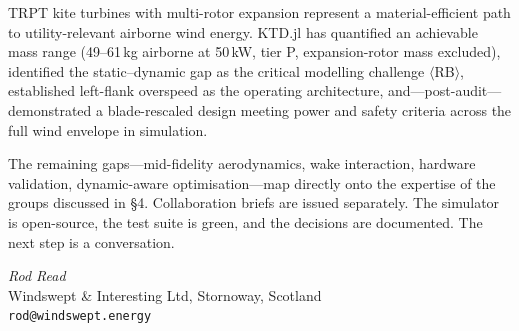 \documentclass[11pt,a4paper]{article}
\newcommand{\RB}{$\langle$RB$\rangle$}  %
\begin{document}
TRPT kite turbines with multi-rotor expansion represent a material-efficient path to
utility-relevant airborne wind energy.
KTD.jl has quantified an achievable mass range (49--61\,kg airborne at 50\,kW, tier P,
expansion-rotor mass excluded), identified the static--dynamic gap as the critical modelling
challenge \RB{}, established left-flank overspeed as the operating architecture, and---post-audit---demonstrated
a blade-rescaled design meeting power and safety criteria across the full wind envelope in simulation.

The remaining gaps---mid-fidelity aerodynamics, wake interaction, hardware validation,
dynamic-aware optimisation---map directly onto the expertise of the groups discussed in \S4.
Collaboration briefs are issued separately.
The simulator is open-source, the test suite is green, and the decisions are documented.
The next step is a conversation.

\vspace{18pt}
\begin{center}
\textit{Rod Read}\\
Windswept \& Interesting Ltd, Stornoway, Scotland\\
\texttt{rod@windswept.energy}
\end{center}

\end{document}
